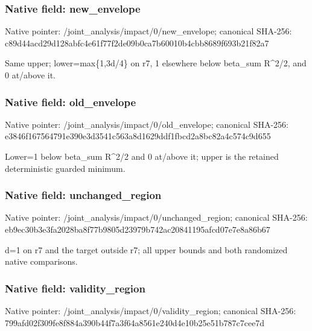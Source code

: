 \documentclass[10pt,a4paper]{article}
\begin{document}
\subsubsection{Native field: new\_\allowbreak{}envelope}
Native pointer: /joint\_\allowbreak{}analysis/impact/0/new\_\allowbreak{}envelope; canonical SHA-256: c89d44acd29d128abfc4e61f77f2de09b0ca7b60010b4cbb8689f693b21f82a7

\begingroup\raggedright\sloppy Same upper;\allowbreak{} lower=\allowbreak{}max\{1,\allowbreak{}3d/\allowbreak{}4\} on r7,\allowbreak{} 1 elsewhere below beta\_\allowbreak{}sum R\textasciicircum{}2/\allowbreak{}2,\allowbreak{} and 0 at/\allowbreak{}above it.\par\endgroup

\subsubsection{Native field: old\_\allowbreak{}envelope}
Native pointer: /joint\_\allowbreak{}analysis/impact/0/old\_\allowbreak{}envelope; canonical SHA-256: e3846f167564791e390e3d3541c563a8d1629ddf1fbcd2a8bc82a4c574c9d655

\begingroup\raggedright\sloppy Lower=\allowbreak{}1 below beta\_\allowbreak{}sum R\textasciicircum{}2/\allowbreak{}2 and 0 at/\allowbreak{}above it;\allowbreak{} upper is the retained deterministic guarded minimum.\par\endgroup

\subsubsection{Native field: unchanged\_\allowbreak{}region}
Native pointer: /joint\_\allowbreak{}analysis/impact/0/unchanged\_\allowbreak{}region; canonical SHA-256: eb9ec30b3e3fa2028ba8f77b9805d23979b742ac20841195afcd07e7e8a86b67

\begingroup\raggedright\sloppy d=\allowbreak{}1 on r7 and the target outside r7;\allowbreak{} all upper bounds and both randomized native comparisons.\par\endgroup

\subsubsection{Native field: validity\_\allowbreak{}region}
Native pointer: /joint\_\allowbreak{}analysis/impact/0/validity\_\allowbreak{}region; canonical SHA-256: 799afd02f309fe8f884a390b44f7a3f64a8561e240d4e10b25e51b787c7cee7d
\end{document}
